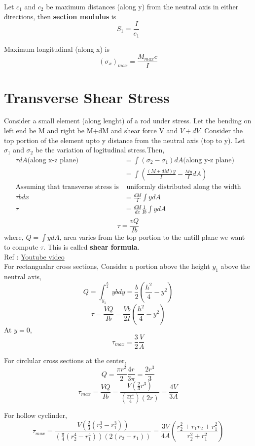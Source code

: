 \documentclass{article}
\begin{document}
		Let $c_1$ and $c_2$ be maximum distances (along y) from the neutral axis in either directions, then \textbf{section modulus} is 
		\[S_1 = \frac{I}{c_1}\]

		Maximum longitudinal (along x) is
		\[\boxed{(\sigma_x)_{max} = \frac{M_{max}c}{I}}\]

\section{Transverse Shear Stress}
		Consider a small element (along lenght) of a rod under stress. Let the bending on left end be M and right be M+dM and shear force V and $V+dV$. Consider the top portion of the element upto y distance from the neutral axis (top to y). Let $\sigma_1$ and $\sigma_2$ be the variation of logitudinal stress.Then, 
		\begin{align*}
			\tau dA \text{(along x-z plane}) &= \int (\sigma_2 - \sigma_1) dA \text{(along y-z plane)}\\
											 &= \int (\frac{(M+dM)y}{I} - \frac{My}{I} dA  )\\
								\text{Assuming that transverse stress is} & \text{ uniformly distributed along the width}\\
									\tau bdx &= \frac{dM}{I} \int ydA \\
										\tau &= \frac{dM}{dx} \frac{1}{Ib} \int ydA\\
		\end{align*}
		\[\boxed{\tau = \frac{vQ}{Ib}}\]
		where, $Q=\int ydA$, area varies from the top portion to the untill plane we want to compute $\tau$. This is called \textbf{shear formula}.\\

		Ref : \href{https://www.youtube.com/watch?v=4x0E9yvzfCM}{Youtube video}\\


		For rectangualar cross sections, Consider a portion above the height $y_1$ above the neutral axis,
		\[Q = \int_{y_1}^{\frac{h}{2}} ybdy = \frac{b}{2}\left(\frac{h^2}{4}- y^2 \right)\]
		\[\tau= \frac{VQ}{Ib} = \frac{Vb}{2I}\left(\frac{h^2}{4}- y^2 \right)\]
		At $y=0$,
		\[\tau_{max} = \frac{3}{2} \frac{V}{A}\]


		For circlular cross sections at the center, 
		\[Q = \frac{\pi r^2}{2}\frac{4r}{3\pi} = \frac{2r^3}{3}\]
		\[\tau_{max} = \frac{VQ}{Ib} = \frac{V(\frac{2}{3}r^3)}{(\frac{\pi r^4}{4})(2r)} = \frac{4V}{3A}\]

		For hollow cyclinder, 
		\[\tau_{max} = \frac{V (\frac{2}{3}(r_2^3 -r_1^3))}{(\frac{\pi}{4}(r_2^4 - r_1^4))(2(r_2-r_1))}= \frac{3V}{4A} \left( \frac{r_2^2 + r_1 r_2 + r_1^2}{r_2^2+r_1^2} \right)\]
\end{document}
